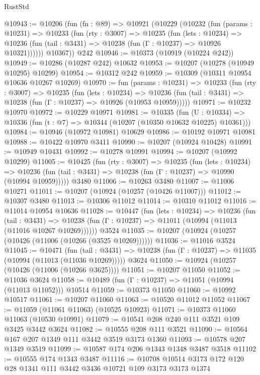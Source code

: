 \begin{lexlean}{RustStd}
\begin{coremodule}
@10943 := @10206
    (fun (fn : @89) =>
    @10921
      (@10229
        (@10232
          (fun (params : @10231) =>
          @10233
            (fun (rty : @3007) =>
            @10235
              (fun (lets : @10234) =>
              @10236 (fun (tail : @3431) => @10238 (fun (Γ : @10237) => @10926 @10321))))))
        @10367))
    @242
@10946 := @10373 (@10919 (@10224 @242))
@10949 := @10286 (@10287 @242) @10632
@10953 := @10207 (@10278 (@10949 @10295) @10299)
@10954 := @10312 @242
@10959 := @10309 (@10311 @10954 @10636 @10267 @10269)
@10970 := fun (params : @10231) =>
  @10233
    (fun (rty : @3007) =>
    @10235
      (fun (lets : @10234) =>
      @10236 (fun (tail : @3431) => @10238 (fun (Γ : @10237) => @10926 (@10953 @10959)))))
@10971 := @10232 @10970
@10972 := @10229 @10971
@10981 := @10335
    (fun (U : @10334) => @10336 (fun (t : @7) => @10344 (@10207 (@10350 @10632 @10225) @10361)))
@10984 := @10946 (@10972 @10981) @10629
@10986 := @10192 @10971 @10981
@10988 := @10422 @10970 @3411
@10990 := @10207 (@10924 @10428)
@10991 := @10949 @10431
@10992 := @10278 @10991
@10994 := @10207 (@10992 @10299)
@11005 := @10425
    (fun (rty : @3007) =>
    @10235
      (fun (lets : @10234) =>
      @10236 (fun (tail : @3431) => @10238 (fun (Γ : @10237) => @10990 (@10994 @10959)))))
    @3480
@11006 := @10263 @3480
@11007 := @11006 @10271
@11011 := @10207 (@10924 (@10257 (@10426 @11007)))
@11012 := @10307 @3480
@11013 := @10306 @11012
@11014 := @10310 @11012
@11016 := @11014 @10954 @10636
@11028 := @10447
    (fun (lets : @10234) =>
    @10236
      (fun (tail : @3431) =>
      @10238 (fun (Γ : @10237) => @11011 (@10994 (@11013 (@11016 @10267 @10269))))))
    @3524
@11035 := @10207 (@10924 (@10257 (@10426 (@11006 (@10266 (@3525 @10269))))))
@11036 := @11016 @3524
@11045 := @10471
    (fun (tail : @3431) => @10238 (fun (Γ : @10237) => @11035 (@10994 (@11013 (@11036 @10269)))))
    @3624
@11050 := @10924 (@10257 (@10426 (@11006 (@10266 @3625))))
@11051 := @10207 @11050
@11052 := @11036 @3624
@11058 := @10489 (fun (Γ : @10237) => @11051 (@10994 (@11013 @11052))) @10514
@11059 := @10373 @11050
@11060 := @10992 @10517
@11061 := @10207 @11060
@11063 := @10520 @11012 @11052
@11067 := @11059 (@11061 @11063) (@10525 @10923)
@11071 := @10373 @11060 @11063 (@10530 @10991)
@11079 := @10541 @208 @240 @111 @3521 @109 @3425 @3442 @3624
@11082 := @10555 @208 @111 @3521
@11090 := @10564 @167 @207 @1349 @111 @3442 @3519 @3173 @1360
@11093 := @10578 @207 @1349 @3519
@11099 := @10587 @174 @206 @1343 @1348 @3487 @3518
@11102 := @10555 @174 @1343 @3487
@11116 := @10708 @10514 @3173 @172 @120 @28 @1341 @111 @3442 @3436 @10721 @109 @3173 @3173 @1374

\end{coremodule}
\end{lexlean}
